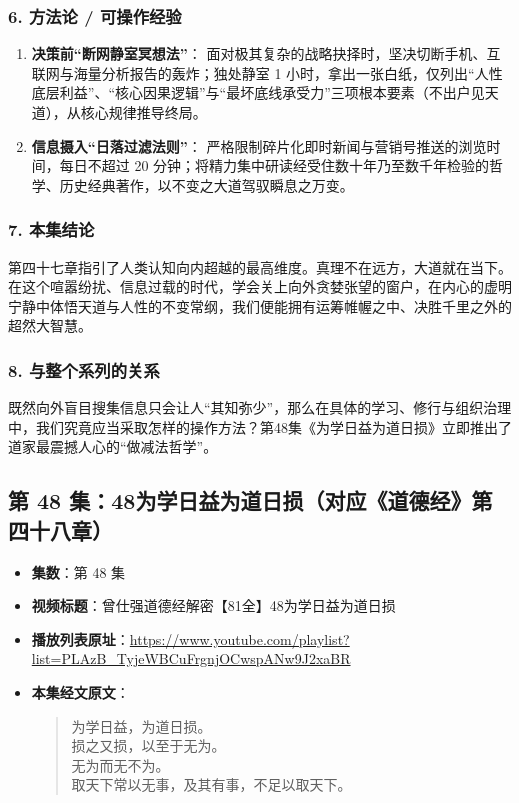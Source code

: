 \subsubsection{6. 方法论 / 可操作经验}
\begin{enumerate}
    \item \textbf{决策前“断网静室冥想法”}：
    面对极其复杂的战略抉择时，坚决切断手机、互联网与海量分析报告的轰炸；独处静室 1 小时，拿出一张白纸，仅列出“人性底层利益”、“核心因果逻辑”与“最坏底线承受力”三项根本要素（不出户见天道），从核心规律推导终局。
    \item \textbf{信息摄入“日落过滤法则”}：
    严格限制碎片化即时新闻与营销号推送的浏览时间，每日不超过 20 分钟；将精力集中研读经受住数十年乃至数千年检验的哲学、历史经典著作，以不变之大道驾驭瞬息之万变。
\end{enumerate}

\subsubsection{7. 本集结论}
第四十七章指引了人类认知向内超越的最高维度。真理不在远方，大道就在当下。在这个喧嚣纷扰、信息过载的时代，学会关上向外贪婪张望的窗户，在内心的虚明宁静中体悟天道与人性的不变常纲，我们便能拥有运筹帷幄之中、决胜千里之外的超然大智慧。

\subsubsection{8. 与整个系列的关系}
既然向外盲目搜集信息只会让人“其知弥少”，那么在具体的学习、修行与组织治理中，我们究竟应当采取怎样的操作方法？第48集《为学日益为道日损》立即推出了道家最震撼人心的“做减法哲学”。

\clearpage

\subsection{第 48 集：48为学日益为道日损（对应《道德经》第四十八章）}
\label{sec:ep48}

\begin{itemize}
    \item \textbf{集数}：第 48 集
    \item \textbf{视频标题}：曾仕强道德经解密【81全】48为学日益为道日损
    \item \textbf{播放列表原址}：\url{https://www.youtube.com/playlist?list=PLAzB_TyjeWBCuFrgnjOCwspANw9J2xaBR}
    \item \textbf{本集经文原文}：
    \begin{quote}\kaishu
    为学日益，为道日损。\\
    损之又损，以至于无为。\\
    无为而无不为。\\
    取天下常以无事，及其有事，不足以取天下。
    \end{quote}
\end{itemize}

